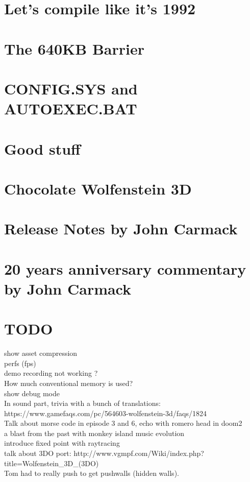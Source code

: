 \documentclass[8pt]{book}
\begin{document}
    \chapter{Let's compile like it's 1992}
    \chapter{The 640KB Barrier}\label{chap:barrier640}
        
    \chapter{CONFIG.SYS and AUTOEXEC.BAT}
         
    \chapter{Good stuff}
          
    \chapter{Chocolate Wolfenstein 3D}
    \chapter{Release Notes by John Carmack}
        
    \chapter{20 years anniversary commentary by John Carmack}
        
    
    
    \chapter{TODO}
    show asset compression\\
    perfs (fps)\\
demo recording not working ?\\
How much conventional memory is used?\\
show debug mode\\
In sound part, trivia with a bunch of translations: https://www.gamefaqs.com/pc/564603-wolfenstein-3d/faqs/1824\\
Talk about morse code in episode 3 and 6, echo with romero head in doom2\\
a blast from the past with monkey island music evolution\\
introduce fixed point with raytracing\\
talk about 3DO port: http://www.vgmpf.com/Wiki/index.php?title=Wolfenstein\_3D\_(3DO)\\
Tom had to really push to get pushwalls (hidden walls).\\


\end{document}
